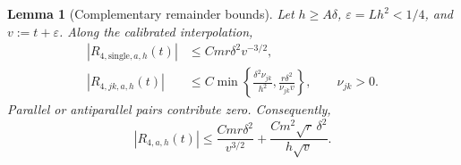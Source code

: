 \documentclass[11pt,letterpaper,twoside,leqno]{article}
\theoremstyle{bookplain}
\newtheorem{lemma}{Lemma}
\theoremstyle{bookremark}
\begin{document}
\begin{lemma}[Complementary remainder bounds]
\label{lem:cap-remainder}
Let $h\ge A\delta$, $\varepsilon=Lh^2<1/4$, and
$v:=t+\varepsilon$. Along the calibrated interpolation,
\begin{align}
 |R_{4,\mathrm{single},a,h}(t)|
 &\le Cmr\delta^2v^{-3/2},
 \label{cap:single}\\
 |R_{4,jk,a,h}(t)|
 &\le C\min\left\{\frac{\delta^2\nu_{jk}}{h^2},
                    \frac{r\delta^2}{\nu_{jk}v}\right\},
 \qquad \nu_{jk}>0.
 \label{cap:pair}
\end{align}
Parallel or antiparallel pairs contribute zero. Consequently,
\begin{equation}
 |R_{4,a,h}(t)|
 \le \frac{Cmr\delta^2}{v^{3/2}}
       +\frac{Cm^2\sqrt r\,\delta^2}{h\sqrt v}.
 \label{cap:complementary}
\end{equation}
\end{lemma}
\end{document}

